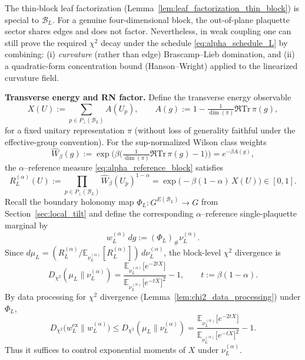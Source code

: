 The thin-block leaf factorization (Lemma~\ref{lem:leaf_factorization_thin_block}) is special to $\mathcal B_L$.
For a genuine four-dimensional block, the out-of-plane plaquette sector shares edges and does not factor.
Nevertheless, in weak coupling one can still prove the required $\chi^2$ decay under the schedule
\eqref{eq:alpha_schedule_L} by combining:
(i) \emph{curvature} (rather than edge) Brascamp--Lieb domination, and
(ii) a quadratic-form concentration bound (Hanson--Wright) applied to the linearized curvature field.

\medskip
\noindent\textbf{Transverse energy and RN factor.}
Define the transverse energy observable
\begin{equation}\label{eq:X_def_alpha}
X(U):=\sum_{p\in P_\perp(\mathcal B_L)}A(U_p),
\qquad
A(g):=1-\tfrac{1}{\dim(\pi)}\Re\mathrm{Tr}\,\pi(g),
\end{equation}
for a fixed unitary representation $\pi$ (without loss of generality faithful under the effective-group convention).
For the sup-normalized Wilson class weights
\[
\widehat W_\beta(g):=\exp\Big(\beta\Big(\tfrac{1}{\dim(\pi)}\Re\mathrm{Tr}\,\pi(g)-1\Big)\Big)=e^{-\beta A(g)},
\]
the $\alpha$--reference measure \eqref{eq:alpha_reference_block} satisfies
\begin{equation}\label{eq:RN_factor_beta}
R_L^{(\alpha)}(U)
:=\prod_{p\in P_\perp(\mathcal B_L)}\widehat W_\beta(U_p)^{1-\alpha}
=\exp\!\big(-\beta(1-\alpha)\,X(U)\big)\in[0,1].
\end{equation}
Recall the boundary holonomy map $\Phi_L:G^{E(\mathcal B_L)}\to G$ from Section~\ref{sec:local_tilt} and define the corresponding
$\alpha$--reference single-plaquette marginal by
\[
w_L^{(\alpha)}\,dg := (\Phi_L)_{\#}\nu_L^{(\alpha)}.
\]
Since $d\mu_L = (R_L^{(\alpha)}/\mathbb E_{\nu_L^{(\alpha)}}[R_L^{(\alpha)}])\,d\nu_L^{(\alpha)}$, the block-level $\chi^2$ divergence is
\[
D_{\chi^2}(\mu_L\|\nu_L^{(\alpha)})
=\frac{\mathbb E_{\nu_L^{(\alpha)}}\!\big[e^{-2tX}\big]}{\mathbb E_{\nu_L^{(\alpha)}}\!\big[e^{-tX}\big]^2}-1,
\qquad t:=\beta(1-\alpha).
\]
By data processing for $\chi^2$ divergence (Lemma~\ref{lem:chi2_data_processing}) under $\Phi_L$,
\begin{equation}\label{eq:chi2_mgf_upper}
D_{\chi^2}\!\bigl(w_L^{\mathrm{ex}}\|w_L^{(\alpha)}\bigr)
\le D_{\chi^2}(\mu_L\|\nu_L^{(\alpha)})
=\frac{\mathbb E_{\nu_L^{(\alpha)}}\!\big[e^{-2tX}\big]}{\mathbb E_{\nu_L^{(\alpha)}}\!\big[e^{-tX}\big]^2}-1.
\end{equation}
Thus it suffices to control exponential moments of $X$ under $\nu_L^{(\alpha)}$.

